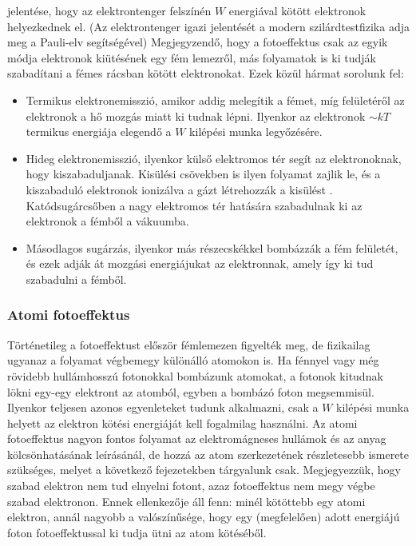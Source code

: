 \documentclass[a4paper,12pt]{article}
\begin{document}
jelentése, hogy az elektrontenger felszínén $W$ energiával kötött elektronok helyezkednek el. (Az elektrontenger igazi jelentését a modern szilárdtestfizika adja meg a Pauli-elv segítségével)
Megjegyzendő, hogy a fotoeffektus csak az egyik módja elektronok kiütésének egy fém lemezről, más folyamatok is ki tudják szabadítani a fémes rácsban kötött elektronokat. Ezek közül hármat sorolunk fel:
\begin{itemize}
    \item Termikus elektronemisszió, amikor addig melegítik a fémet, míg felületéről az elektronok a hő mozgás miatt ki tudnak lépni. Ilyenkor az elektronok $\sim kT$ termikus energiája elegendő a $W$ kilépési munka legyőzésére.
    \item Hideg elektronemisszió, ilyenkor külső elektromos tér segít az elektronoknak, hogy kiszabaduljanak. Kisülési csövekben is ilyen folyamat zajlik le, és a kiszabaduló elektronok ionizálva a gázt létrehozzák a kisülést . Katódsugárcsőben a nagy elektromos tér hatására szabadulnak ki az elektronok a fémből a vákuumba.
    \item Másodlagos sugárzás, ilyenkor más részecskékkel bombázzák a fém felületét, és ezek adják át mozgási energiájukat az elektronnak, amely így ki tud szabadulni a fémből.
\end{itemize}

\subsubsection{Atomi fotoeffektus}
Történetileg a fotoeffektust először fémlemezen figyelték meg, de fizikailag ugyanaz a folyamat végbemegy különálló atomokon is. Ha fénnyel vagy még
rövidebb hullámhosszú fotonokkal bombázunk atomokat, a fotonok kitudnak lökni egy-egy elektront az atomból, egyben a bombázó foton megsemmisül. Ilyenkor teljesen azonos egyenleteket tudunk alkalmazni, csak a $W$
kilépési munka helyett az elektron kötési energiáját kell fogalmilag használni. Az atomi fotoeffektus nagyon fontos folyamat az elektromágneses hullámok és az anyag kölcsönhatásának leírásánál, de hozzá az atom szerkezetének
részletesebb ismerete szükséges, melyet a következő fejezetekben tárgyalunk csak. Megjegyezzük, hogy szabad elektron nem tud elnyelni fotont, azaz fotoeffektus nem megy végbe szabad elektronon. Ennek ellenkezője áll fenn:
minél kötöttebb egy atomi elektron, annál nagyobb a valószínűsége, hogy egy (megfelelően) adott energiájú foton fotoeffektussal ki tudja ütni az atom kötéséből.
\end{document}
